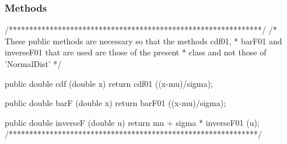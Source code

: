 \subsubsection* {Methods}
\begin{code}
\begin{hide}

  /**************************************************************/
  /*  These public methods are necessary so that the methods cdf01,
   *  barF01 and inverseF01 that are used are those of the present
   *  class and not those of 'NormalDist'
   */

   public double cdf (double x) {
      return cdf01 ((x-mu)/sigma);
   }

   public double barF (double x) {
      return barF01 ((x-mu)/sigma);
   }

   public double inverseF (double u) {
      return mu + sigma * inverseF01 (u);
   }
   /*************************************************************/


\end{hide}
\end{code}
